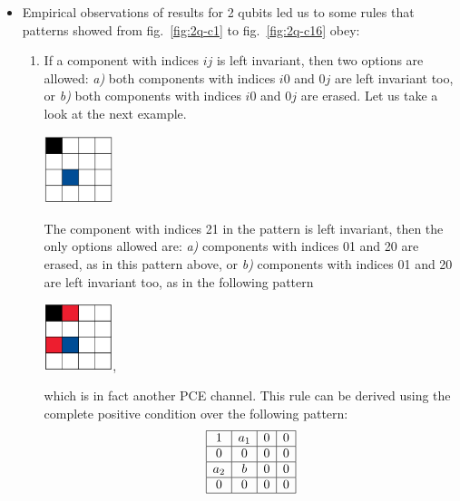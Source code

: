 \documentclass[11pt,dvipsnames]{article} %
\newcommand{\fref}[1]{fig.~\ref{#1}}
\newcommand{\1}{\mathds{1}}
\begin{document}
\begin{itemize}
\item Empirical observations of results for 2 qubits 
led us to some rules that 
patterns showed from \fref{fig:2q-c1} to \fref{fig:2q-c16} obey:
\begin{enumerate}
\item If a component with indices $ij$ is left invariant, then two options are
allowed: \textit{a)} both components with indices $i0$ and $0j$ are left
invariant too, or \textit{b)} both components with indices $i0$ and $0j$ are
erased.
Let us take a look at the next example. 
\begin{center}
\includegraphics[width=2cm]{ex-2q2c-empiricalRule}
\end{center}
The component with indices 21 in the pattern is left invariant,
then the only options allowed are: \textit{a)} components with indices 01 and
20 are erased, as in this pattern above, or \textit{b)} components 
with indices 01 and 20 are left invariant too, 
as in the following pattern 
\begin{center}
\includegraphics[width=2cm]{ex-2q4c-empiricalRule},
\end{center}
which is in fact another PCE channel. This rule can be derived using the complete positive condition over the following pattern:
\begin{equation}
\begin{array}{|c|c|c|c|}
\hline
1 & a_1 & 0 & 0 \\ 
\hline
0 & 0 & 0 & 0 \\ 
\hline
a_2 & b & 0 & 0 \\ 
\hline
0 & 0 & 0 & 0\\
\hline
\end{array}
\end{equation}


\end{enumerate}
\end{itemize}
\end{document}

